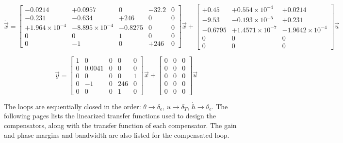 \documentclass[11pt]{article}
\begin{document}
$$
\dot{\vec{x}} = \left[ \begin{array}{ccccc}
  -0.0214              &  +0.0957             &    0      &  -32.2 & 0 \\
   -0.231              &  -0.634              & +246      &    0   & 0 \\
   +1.964\times10^{-4} &  -8.895\times10^{-4} &   -0.8275 &    0   & 0 \\
    0                  &   0                  &    1      &    0   & 0 \\
    0                  &  -1                  &    0      & +246   & 0 \end{array} \right]
\vec{x} + \left[\begin{array}{ccc}
      +0.45            & +0.554\times10^{-4}  & +0.0214                \\ 
      -9.53            & -0.193\times10^{-5}  & +0.231                 \\
    -0.6795            & +1.4571\times10^{-7} & -1.9642\times10^{-4}   \\ 
          0            &  0                   &  0                     \\ 
          0            &  0                   &  0 \end{array}\right] \vec{u}  
$$

$$
\vec{y} = \left[ \begin{array}{ccccc}
         1 &   0      &   0   &    0   &  0 \\
         0 &   0.0041 &   0   &    0   &  0 \\
         0 &   0      &   0   &    0   &  1 \\
         0 &  -1      &   0   &  246   &  0 \\
         0 &   0      &   0   &    1   &  0 \end{array} \right]
\vec{x}+\left[\begin{array}{ccc}
         0 &   0      & 0 \\ 
         0 &   0      & 0 \\
         0 &   0      & 0 \\
         0 &   0      & 0 \\
         0 &   0      & 0 \end{array}\right]\vec{u}
$$
         
\vspace{25pt}
The loops are sequentially closed in the order: $\theta\rightarrow\delta_e$, $u\rightarrow\delta_T$, $\dot{h}\rightarrow\theta_e$.
The following pages lists the linearized transfer functions used to design the compensators, along with the transfer function of each compensator.
The gain and phase margins and bandwidth are also listed for the compensated loop.
\end{document}
